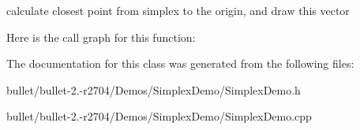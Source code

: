 calculate closest point from simplex to the origin, and draw this vector 

Here is the call graph for this function\+:




The documentation for this class was generated from the following files\+:\begin{DoxyCompactItemize}
\item 
bullet/bullet-\/2.-\/r2704/\+Demos/\+Simplex\+Demo/Simplex\+Demo.\+h\item 
bullet/bullet-\/2.-\/r2704/\+Demos/\+Simplex\+Demo/Simplex\+Demo.\+cpp\end{DoxyCompactItemize}
